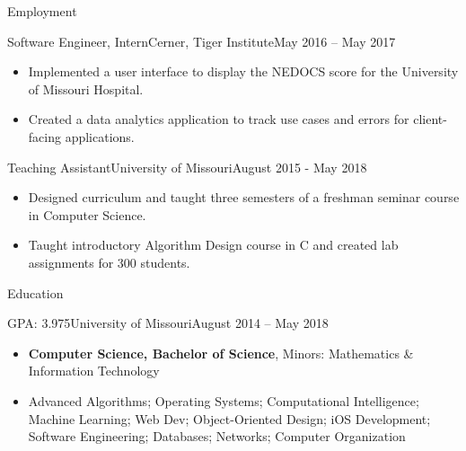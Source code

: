 \documentclass[]{mcdowellcv}
\begin{document}
\begin{cvsection}{Employment}
        \begin{cvsubsection}{Software Engineer, Intern}{Cerner, Tiger Institute}{May 2016 -- May 2017}		
            \begin{itemize}
                \item Implemented a user interface to display the NEDOCS score for the University of Missouri Hospital.
                \item Created a data analytics application to track use cases and errors for client-facing applications.
            \end{itemize}
        \end{cvsubsection}

        \begin{cvsubsection}{Teaching Assistant}{University of Missouri}{August 2015 - May 2018}
            \begin{itemize}
                \item Designed curriculum and taught three semesters of a freshman seminar course in Computer Science.
                \item Taught introductory Algorithm Design course in C and created lab assignments for 300 students.
            \end{itemize}
        \end{cvsubsection}

    \end{cvsection}
    
    \begin{cvsection}{Education}
        \begin{cvsubsection}{GPA: 3.975}{University of Missouri}{August 2014 -- May 2018}
            \begin{itemize}
                \item \textbf{Computer Science, Bachelor of Science}, Minors: Mathematics \& Information Technology
                \item Advanced Algorithms; Operating Systems; Computational Intelligence; Machine Learning; Web Dev; Object-Oriented Design;
                        iOS Development; Software Engineering; Databases; Networks; Computer Organization
            \end{itemize}
        \end{cvsubsection}
    \end{cvsection}
    
\end{document}
